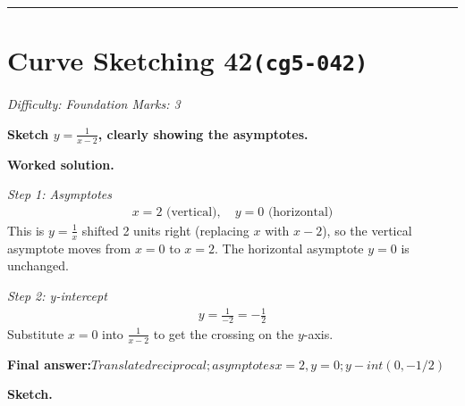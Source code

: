 \documentclass[11pt]{article}
\newcommand{\question}[1]{\par\medskip\noindent\textbf{#1}\par}
\begin{document}
\medskip\hrule

\section*{Curve Sketching 42\quad\small\texttt{(cg5-042)}}
\textit{Difficulty: Foundation \quad\textbar\quad Marks: 3}

\question{Sketch \( y = \frac{1}{x-2} \), clearly showing the asymptotes.}

\textbf{Worked solution.}

\textit{Step 1: Asymptotes}
\[\begin{gathered}
x = 2 \text{ (vertical)}, \quad y = 0 \text{ (horizontal)}
\end{gathered}\]
This is \( y = \tfrac{1}{x} \) shifted 2 units right (replacing \( x \) with \( x - 2 \)), so the vertical asymptote moves from \( x = 0 \) to \( x = 2 \). The horizontal asymptote \( y = 0 \) is unchanged.

\textit{Step 2: y-intercept}
\[\begin{gathered}
y = \frac{1}{-2} = -\frac{1}{2}
\end{gathered}\]
Substitute \( x = 0 \) into \( \tfrac{1}{x - 2} \) to get the crossing on the \( y \)-axis.

\begin{answerbox}
\textbf{Final answer:}\quad \(\displaystyle Translated reciprocal; asymptotes x = 2, y = 0; y-int (0, -1/2)\)
\end{answerbox}
\textbf{Sketch.}
\end{document}
